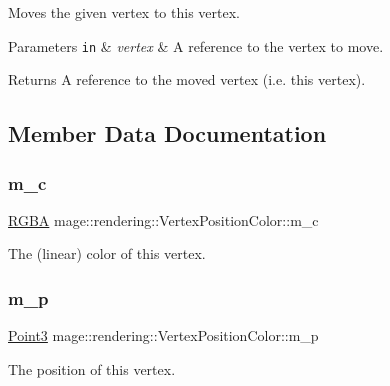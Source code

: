 Moves the given vertex to this vertex.


\begin{DoxyParams}[1]{Parameters}
\mbox{\tt in}  & {\em vertex} & A reference to the vertex to move. \\
\hline
\end{DoxyParams}
\begin{DoxyReturn}{Returns}
A reference to the moved vertex (i.\+e. this vertex). 
\end{DoxyReturn}


\subsection{Member Data Documentation}
\hypertarget{structmage_1_1rendering_1_1_vertex_position_color_a76bd7cc2bbec92bbaf38f72087fdd069}{}\label{structmage_1_1rendering_1_1_vertex_position_color_a76bd7cc2bbec92bbaf38f72087fdd069} 
\subsubsection{\texorpdfstring{m\+\_\+c}{m\_c}}
{\footnotesize\ttfamily \hyperlink{structmage_1_1_r_g_b_a}{R\+G\+BA} mage\+::rendering\+::\+Vertex\+Position\+Color\+::m\+\_\+c}

The (linear) color of this vertex. \hypertarget{structmage_1_1rendering_1_1_vertex_position_color_a2c1c6a22bff4eca8cee086cc978d008b}{}\label{structmage_1_1rendering_1_1_vertex_position_color_a2c1c6a22bff4eca8cee086cc978d008b} 
\subsubsection{\texorpdfstring{m\+\_\+p}{m\_p}}
{\footnotesize\ttfamily \hyperlink{structmage_1_1_point3}{Point3} mage\+::rendering\+::\+Vertex\+Position\+Color\+::m\+\_\+p}

The position of this vertex. \hypertarget{structmage_1_1rendering_1_1_vertex_position_color_a0e9bd3e8e7cad0a5167aaeb76de9fbb3}{}\label{structmage_1_1rendering_1_1_vertex_position_color_a0e9bd3e8e7cad0a5167aaeb76de9fbb3} 
